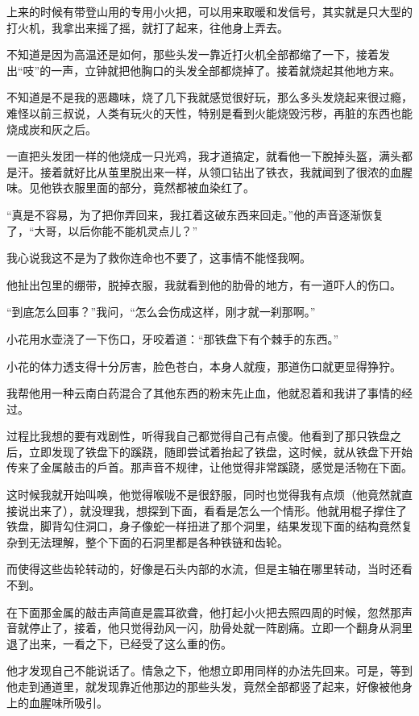上来的时候有带登山用的专用小火把，可以用来取暖和发信号，其实就是只大型的打火机，我拿出来摇了摇，就打了起来，往他身上弄去。

不知道是因为高温还是如何，那些头发一靠近打火机全部都缩了一下，接着发出“吱”的一声，立钟就把他胸口的头发全部都烧掉了。接着就烧起其他地方来。

不知道是不是我的恶趣味，烧了几下我就感觉很好玩，那么多头发烧起来很过瘾，难怪以前三叔说，人类有玩火的天性，特别是看到火能烧毁污秽，再脏的东西也能烧成炭和灰之后。

一直把头发团一样的他烧成一只光鸡，我才道搞定，就看他一下脫掉头盔，满头都是汗。接着就好比从茧里脱出来一样，从领口钻出了铁衣，我就闻到了很浓的血腥味。见他铁衣服里面的部分，竟然都被血染红了。

“真是不容易，为了把你弄回来，我扛着这破东西来回走。”他的声音逐渐恢复了，“大哥，以后你能不能机灵点儿？”

我心说我这不是为了救你连命也不要了，这事情不能怪我啊。

他扯出包里的绷带，脱掉衣服，我就看到他的肋骨的地方，有一道吓人的伤口。

“到底怎么回事？”我问，“怎么会伤成这样，刚才就一刹那啊。”

小花用水壶浇了一下伤口，牙咬着道：“那铁盘下有个棘手的东西。”

小花的体力透支得十分厉害，脸色苍白，本身人就瘦，那道伤口就更显得狰狞。

我帮他用一种云南白药混合了其他东西的粉末先止血，他就忍着和我讲了事情的经过。

过程比我想的要有戏剧性，听得我自己都觉得自己有点傻。他看到了那只铁盘之后，立即发现了铁盘下的蹊跷，随即尝试着抬起了铁盘，这时候，就从铁盘下开始传来了金属敲击的戶首。那声音不规律，让他觉得非常蹊跷，感觉是活物在下面。

这时候我就开始叫唤，他觉得喉咙不是很舒服，同时也觉得我有点烦（他竟然就直接说出来了），就没理我，想探到下面，看看是怎么一个情形。他就用棍子撑住了铁盘，脚背勾住洞口，身子像蛇一样扭进了那个洞里，结果发现下面的结构竟然复杂到无法理解，整个下面的石洞里都是各种铁链和齿轮。

而使得这些齿轮转动的，好像是石头内部的水流，但是主轴在哪里转动，当时还看不到。

在下面那金属的敲击声简直是震耳欲聋，他打起小火把去照四周的时候，忽然那声音就停止了，接着，他只觉得劲风一闪，肋骨处就一阵剧痛。立即一个翻身从洞里退了出来，一看之下，已经受了这么重的伤。

他才发现自己不能说话了。情急之下，他想立即用同样的办法先回来。可是，等到他走到通道里，就发现靠近他那边的那些头发，竟然全部都竖了起来，好像被他身上的血腥味所吸引。

